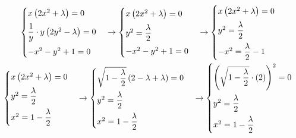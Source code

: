 \documentclass[a4paper]{article}
\begin{document}
	\begin{gather*}
		\begin{cases}
			x\left(2x^{2}+\lambda\right) = 0 \vspace{.5em} \\
			\dfrac{1}{y} \cdot y\left(2y^{2}-\lambda\right) = 0 \vspace{.5em} \\
			-x^{2}-y^{2}+1 = 0
		\end{cases}
		\rightarrow
		\begin{cases}
			x\left(2x^{2}+\lambda\right) = 0 \vspace{.5em}\\
			y^{2} = \dfrac{\lambda}{2} \vspace{.5em}\\
			-x^{2}-y^{2}+1 = 0
		\end{cases}
		\rightarrow
		\begin{cases}
			x\left(2x^{2}+\lambda\right) = 0 \vspace{.5em}\\
			y^{2} = \dfrac{\lambda}{2} \vspace{.5em}\\
			-x^{2} = \dfrac{\lambda}{2}-1
		\end{cases}
		\\
		\begin{cases}
			x\left(2x^{2}+\lambda\right) = 0 \vspace{.5em}\\
			y^{2} = \dfrac{\lambda}{2} \vspace{.5em}\\
			x^{2} = 1-\dfrac{\lambda}{2}
		\end{cases}
		\rightarrow
		\begin{cases}
			\sqrt{1-\dfrac{\lambda}{2}}\left(2 - \lambda +\lambda\right) = 0 \vspace{.5em}\\
			y^{2} = \dfrac{\lambda}{2} \vspace{.5em}\\
			x^{2} = 1-\dfrac{\lambda}{2}
		\end{cases}
		\rightarrow
		\begin{cases}
			\left(\sqrt{1-\dfrac{\lambda}{2}} \cdot \left(2\right)\right)^{2} = 0 \vspace{.5em}\\
			y^{2} = \dfrac{\lambda}{2} \vspace{.5em}\\
			x^{2} = 1-\dfrac{\lambda}{2}
		\end{cases}

\end{gather*}
\end{document}
